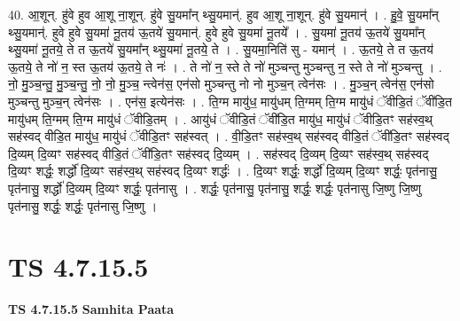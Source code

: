 \documentclass[17pt]{extarticle}
\begin{document}
40. आ॒शून्. हु॑वे हुव आ॒शू ना॒शून्. हु॑वे सु॒यमा᳚न् थ्सु॒यमान्॑. हुव आ॒शू ना॒शून्. हु॑वे सु॒यमान्॑ । . हु॒वे॒ सु॒यमा᳚न् थ्सु॒यमान्॑. हुवे हुवे सु॒यमा॑ नू॒तय॑ ऊ॒तये॑ सु॒यमान्॑. हुवे हुवे सु॒यमा॑ नू॒तये᳚ । . सु॒यमा॑ नू॒तय॑ ऊ॒तये॑ सु॒यमा᳚न् थ्सु॒यमा॑ नू॒तये॒ ते त ऊ॒तये॑ सु॒यमा᳚न् थ्सु॒यमा॑ नू॒तये॒ ते । . सु॒यमा॒निति॑ सु - यमान्॑ । . ऊ॒तये॒ ते त ऊ॒तय॑ ऊ॒तये॒ ते नो॑ न॒ स्त ऊ॒तय॑ ऊ॒तये॒ ते नः॑ । . ते नो॑ न॒ स्ते ते नो॑ मुञ्चन्तु मुञ्चन्तु न॒ स्ते ते नो॑ मुञ्चन्तु । . नो॒ मु॒ञ्च॒न्तु॒ मु॒ञ्च॒न्तु॒ नो॒ नो॒ मु॒ञ्च॒ न्त्वेन॑स॒ एन॑सो मुञ्चन्तु नो नो मुञ्च॒न् त्वेन॑सः । . मु॒ञ्च॒न् त्वेन॑स॒ एन॑सो मुञ्चन्तु मुञ्च॒न् त्वेन॑सः । . एन॑स॒ इत्येन॑सः । . ति॒ग्म मायु॑ध॒ मायु॑धम् ति॒ग्मम् ति॒ग्म मायु॑धं ॅवीडि॒तं ॅवी॑डि॒त मायु॑धम् ति॒ग्मम् ति॒ग्म मायु॑धं ॅवीडि॒तम् । . आयु॑धं ॅवीडि॒तं ॅवी॑डि॒त मायु॑ध॒ मायु॑धं ॅवीडि॒तꣳ सह॑स्व॒थ् सह॑स्वद् वीडि॒त मायु॑ध॒ मायु॑धं ॅवीडि॒तꣳ सह॑स्वत् । . वी॒डि॒तꣳ सह॑स्व॒थ् सह॑स्वद् वीडि॒तं ॅवी॑डि॒तꣳ सह॑स्वद् दि॒व्यम् दि॒व्यꣳ सह॑स्वद् वीडि॒तं ॅवी॑डि॒तꣳ सह॑स्वद् दि॒व्यम् । . सह॑स्वद् दि॒व्यम् दि॒व्यꣳ सह॑स्व॒थ् सह॑स्वद् दि॒व्यꣳ शर्द्धः॒ शर्द्धो॑ दि॒व्यꣳ सह॑स्व॒थ् सह॑स्वद् दि॒व्यꣳ शर्द्धः॑ । . दि॒व्यꣳ शर्द्धः॒ शर्द्धो॑ दि॒व्यम् दि॒व्यꣳ शर्द्धः॒ पृत॑नासु॒ पृत॑नासु॒ शर्द्धो॑ दि॒व्यम् दि॒व्यꣳ शर्द्धः॒ पृत॑नासु । . शर्द्धः॒ पृत॑नासु॒ पृत॑नासु॒ शर्द्धः॒ शर्द्धः॒ पृत॑नासु जि॒ष्णु जि॒ष्णु पृत॑नासु॒ शर्द्धः॒ शर्द्धः॒ पृत॑नासु जि॒ष्णु । \newline
\pagebreak
{}

\section{ TS 4.7.15.5 }

\textbf{TS 4.7.15.5 } \newline
\textbf{Samhita Paata} \newline
\end{document}
